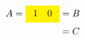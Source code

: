 \documentclass{article}
\begin{document}
\begin{equation*}\begin{split}
A=\colorbox{yellow}{$\begin{array}{cc}1 &0\end{array}$}&=B\\
&=C
\end{split}\end{equation*}
\end{document}

